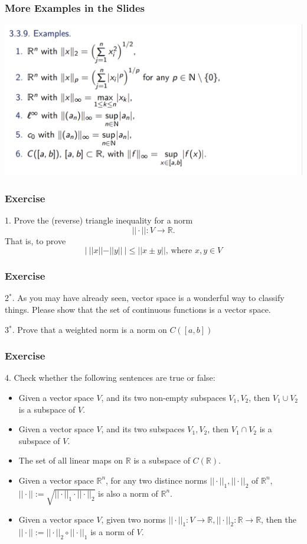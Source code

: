 \documentclass{beamer}
\begin{document}
\begin{frame}
    \frametitle{More Examples in the Slides}
    \centering
    \includegraphics[width=1\textwidth]{example.png}
    
\end{frame}
\begin{frame}
    \frametitle{Exercise}
1. Prove the (reverse) triangle inequality for a norm
\begin{equation*}
    ||\cdot||:V\rightarrow \mathbb{R}. 
\end{equation*}
That is, to prove 
\begin{equation*}
    |\ ||x||-||y||\ |\leq ||x\pm y||\text{, where }x,y\in V
\end{equation*}
\end{frame}
\begin{frame}
    \frametitle{Exercise}
2$^*$. As you may have already seen, 
vector space is a wonderful way to classify 
things. Please show that the set of continuous 
functions is a vector space. 

   \vspace{4em} 
3$^*$. Prove that a weighted norm is a norm
on $C([a,b])$
\end{frame}
\begin{frame}
    \frametitle{Exercise}
4. Check whether the following sentences are true or false:
\begin{itemize}
    \item Given a vector space $V$, and its two non-empty subspaces $V_1, V_2$, then $V_1\cup V_2$ is a subspace of $V$.
    \item Given a vector space $V$, and its two subspaces $V_1,V_2$, then $V_1\cap V_2$ is a subspace of $V$.
    \item The set of all linear maps on $\mathbb{R}$ is a subspace of $C(\mathbb{R})$.
    \item Given a vector space $\mathbb{R}^n$, for any two distince norms $||\cdot||_1, ||\cdot||_2$ of $\mathbb{R}^n$, $||\cdot||:=\sqrt{||\cdot||_1\cdot||\cdot||_2}$ is also a norm of $\mathbb{R}^n$.
    \item Given a vector space $V$, given two norms $||\cdot||_1:V\rightarrow\mathbb{R}, ||\cdot||_2:\mathbb{R}\rightarrow\mathbb{R}$, then the $||\cdot||:=||\cdot||_2\circ||\cdot||_1$ is a norm of $V$.
\end{itemize}
\end{frame}
\end{document}
